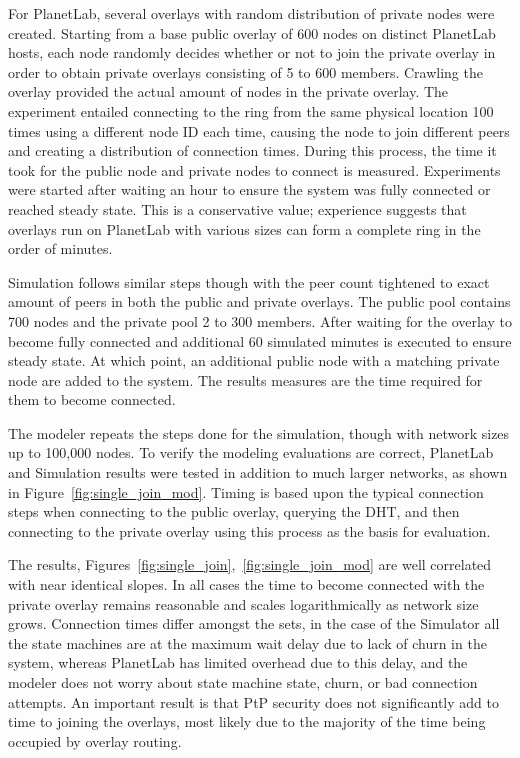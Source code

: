 For PlanetLab, several overlays with random distribution of private nodes were
created.  Starting from a base public overlay of 600 nodes on distinct PlanetLab
hosts, each node randomly decides whether or not to join the private overlay in
order to obtain private overlays consisting of 5 to 600 members.  Crawling the
overlay provided the actual amount of nodes in the private overlay.  The
experiment entailed connecting to the ring from the same physical location 100
times using a different node ID each time, causing the node to join different
peers and creating a distribution of connection times. During this process, the
time it took for the public node and private nodes to connect is measured.  
Experiments were started after waiting an hour to ensure the system was fully
connected or reached steady state.  This is a conservative value; experience
suggests that overlays run on PlanetLab with various sizes can form a complete
ring in the order of minutes.

Simulation follows similar steps though with the peer count tightened to exact
amount of peers in both the public and private overlays.  The public pool
contains 700 nodes and the private pool 2 to 300 members.  After waiting for
the overlay to become fully connected and additional 60 simulated minutes is
executed to ensure steady state.  At which point, an additional public node
with a matching private node are added to the system.  The results measures are
the time required for them to become connected.

The modeler repeats the steps done for the simulation, though with network
sizes up to 100,000 nodes.  To verify the modeling evaluations are correct,
PlanetLab and Simulation results were tested in addition to much larger
networks, as shown in Figure~\ref{fig:single_join_mod}.  Timing is based upon
the typical connection steps when connecting to the public overlay, querying
the DHT, and then connecting to the private overlay using this process as the
basis for evaluation.

The results, Figures~\ref{fig:single_join},~\ref{fig:single_join_mod} are well
correlated with near identical slopes.  In all cases the time to become
connected with the private overlay remains reasonable and scales logarithmically
as network size grows.  Connection times differ amongst the sets, in the case of
the Simulator all the state machines are at the maximum wait delay due to lack
of churn in the system, whereas PlanetLab has limited overhead due to this
delay, and the modeler does not worry about state machine state, churn, or bad
connection attempts.  An important result is that PtP security does not
significantly add to time to joining the overlays, most likely due to the
majority of the time being occupied by overlay routing.

